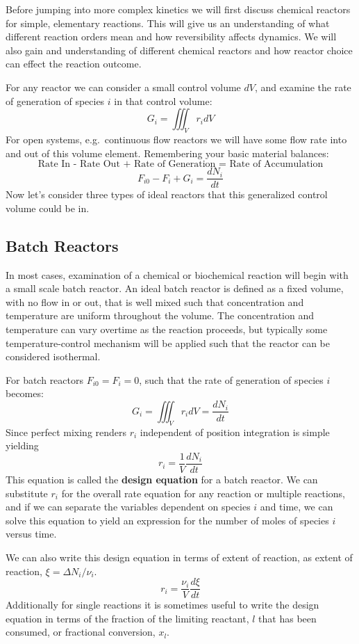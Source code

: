 \documentclass[
]{article}
\begin{document}
Before jumping into more complex kinetics we will first discuss chemical reactors for simple, elementary reactions. This will give us an understanding of what different reaction orders mean and how reversibility affects dynamics. We will also gain and understanding of different chemical reactors and how reactor choice can effect the reaction outcome.

For any reactor we can consider a small control volume \(dV\), and examine the rate of generation of species \(i\) in that control volume:
\[G_i = \iiint_V r_idV\]
For open systems, e.g.~continuous flow reactors we will have some flow rate into and out of this volume element. Remembering your basic material balances:
\[\text{Rate In - Rate Out + Rate of Generation = Rate of Accumulation}\]
\[F_{i0} - F_i + G_i = \frac{dN_i}{dt}\]
Now let's consider three types of ideal reactors that this generalized control volume could be in.

\hypertarget{batch-reactors}{%
\subsection{Batch Reactors}\label{batch-reactors}}

In most cases, examination of a chemical or biochemical reaction will begin with a small scale batch reactor. An ideal batch reactor is defined as a fixed volume, with no flow in or out, that is well mixed such that concentration and temperature are uniform throughout the volume. The concentration and temperature can vary overtime as the reaction proceeds, but typically some temperature-control mechanism will be applied such that the reactor can be considered isothermal.

For batch reactors \(F_{i0} = F_i = 0\), such that the rate of generation of species \(i\) becomes:
\[G_i = \iiint_V r_idV = \frac{dN_i}{dt}\]
Since perfect mixing renders \(r_i\) independent of position integration is simple yielding
\[r_i =\frac{1}{V} \frac{dN_i}{dt}\]
This equation is called the \textbf{design equation} for a batch reactor.
We can substitute \(r_i\) for the overall rate equation for any reaction or multiple reactions, and if we can separate the variables dependent on species \(i\) and time, we can solve this equation to yield an expression for the number of moles of species \(i\) versus time.

We can also write this design equation in terms of extent of reaction, as extent of reaction, \(\xi = \Delta N_i / \nu_i\).
\[r_i = \frac{\nu_i}{V} \frac{d\xi}{dt}\]
Additionally for single reactions it is sometimes useful to write the design equation in terms of the fraction of the limiting reactant, \(l\) that has been consumed, or fractional conversion, \(x_l\).
\end{document}
